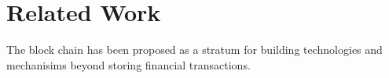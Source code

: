 \section{Related Work}
\label{sec:related}

The block chain has been proposed as a stratum for building technologies and mechanisims beyond storing financial transactions. \cite{clark2012commitcoin, bonneau2014decentralizing}